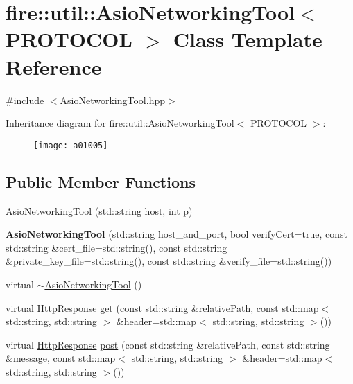 \hypertarget{a01005}{}\section{fire\+:\+:util\+:\+:Asio\+Networking\+Tool$<$ P\+R\+O\+T\+O\+C\+OL $>$ Class Template Reference}
\label{a01005}


{\ttfamily \#include $<$Asio\+Networking\+Tool.\+hpp$>$}

Inheritance diagram for fire\+:\+:util\+:\+:Asio\+Networking\+Tool$<$ P\+R\+O\+T\+O\+C\+OL $>$\+:\begin{figure}[H]
\begin{center}
\leavevmode
\texttt{[image: a01005]}
\end{center}
\end{figure}
\subsection*{Public Member Functions}
\begin{DoxyCompactItemize}
\item 
\hyperlink{a01005_a5edd72ce9937e052a82e7564500b3861}{Asio\+Networking\+Tool} (std\+::string host, int p)
\item 
\mbox{\label{a01005_a5826de4a9e051ec854ad7be3a48ac86d}} 
{\bfseries Asio\+Networking\+Tool} (std\+::string host\+\_\+and\+\_\+port, bool verify\+Cert=true, const std\+::string \&cert\+\_\+file=std\+::string(), const std\+::string \&private\+\_\+key\+\_\+file=std\+::string(), const std\+::string \&verify\+\_\+file=std\+::string())
\item 
virtual \hyperlink{a01005_afc51c728e1bd136b6729ac892df490ab}{$\sim$\+Asio\+Networking\+Tool} ()
\item 
virtual \hyperlink{a01009}{Http\+Response} \hyperlink{a01005_a42609f768f245acf0867889e920c5d49}{get} (const std\+::string \&relative\+Path, const std\+::map$<$ std\+::string, std\+::string $>$ \&header=std\+::map$<$ std\+::string, std\+::string $>$())
\item 
virtual \hyperlink{a01009}{Http\+Response} \hyperlink{a01005_a2ac524ceef89fceb928cf74420bf90a5}{post} (const std\+::string \&relative\+Path, const std\+::string \&message, const std\+::map$<$ std\+::string, std\+::string $>$ \&header=std\+::map$<$ std\+::string, std\+::string $>$())
\end{DoxyCompactItemize}
